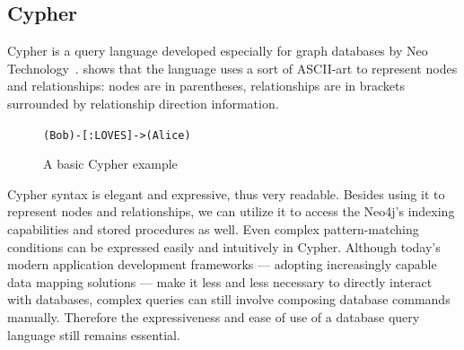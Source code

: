 \subsection{Cypher}

Cypher is a query language developed especially for graph databases by Neo Technology~\cite{neo4j-cypher}.  shows that the language uses a sort of ASCII-art to represent nodes and relationships: nodes are in parentheses, relationships are in brackets surrounded by relationship direction information.

\begin{figure}[!htb]
    \centering
    \lstinline{(Bob)-[:LOVES]->(Alice)}
    \caption{A basic Cypher example}
    \label{fig:cypher-intro}
\end{figure}

Cypher syntax is elegant and expressive, thus very readable. Besides using it to represent nodes and relationships, we can utilize it to access the Neo4j's indexing capabilities and stored procedures as well. Even complex pattern-matching conditions can be expressed easily and intuitively in Cypher. Although today's modern application development frameworks — adopting increasingly capable data mapping solutions — make it less and less necessary to directly interact with databases, complex queries can still involve composing database commands manually. Therefore the expressiveness and ease of use of a database query language still remains essential.
